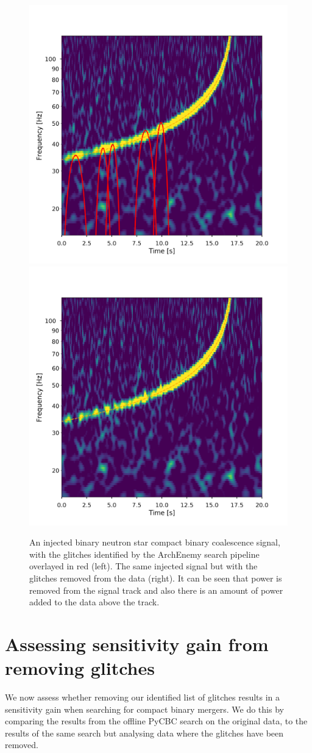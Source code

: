 \begin{figure}
  \centering
  \begin{minipage}[t]{1.0\linewidth}
    \includegraphics[width=0.49\linewidth]{images/archenemy/Section3/3.8/L1_loud_Original.pdf}
    \hspace{0.02\linewidth}
    \includegraphics[width=0.49\linewidth]{images/archenemy/Section3/3.8/L1_loud_Subtracted.pdf}
  \end{minipage}
    \caption{An injected binary neutron star compact binary coalescence \gw{} signal, with the \scl{} glitches identified by the ArchEnemy search pipeline overlayed in red (left). The same injected signal but with the \scl{} glitches removed from the data (right). It can be seen that power is removed from the signal track and also there is an amount of power added to the data above the track.}
    \label{fig:loud_inj}
\end{figure}

\section{\label{sec:results}Assessing sensitivity gain from removing \scl{} glitches}

We now assess whether removing our identified list of \scl{} glitches results in a sensitivity gain when searching for compact binary mergers. We do this by comparing the results from the offline PyCBC search on the original data, to the results of the same search but analysing data where the glitches have been removed.

